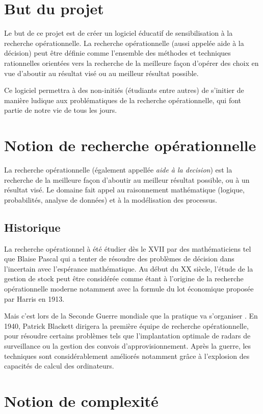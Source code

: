 \setcounter{footnote}{0}

\section{But du projet}
Le but de ce projet est de créer un logiciel éducatif de sensibilisation à la recherche
opérationnelle. La recherche opérationnelle (aussi appelée aide à la décision) peut être définie
comme l'ensemble des méthodes et techniques rationnelles orientées vers la recherche de
la meilleure façon d'opérer des choix en vue d'aboutir au résultat visé ou au meilleur résultat possible.%
~\cite{ref.yrr}

Ce logiciel permettra à des non-initiés (étudiants entre autres) de s'initier
de manière ludique aux problématiques de la recherche opérationnelle, qui font partie de notre
vie de tous les jours.

\section{Notion de recherche opérationnelle}
La recherche opérationnelle (également appellée \emph{aide à la decision})
est la recherche de la meilleure façon d'aboutir au meilleur résultat
possible, ou à un résultat visé. Le domaine fait appel au raisonnement 
mathématique (logique, probabilités, analyse de données) et à la modélisation 
des processus. 

\subsection{Historique}
La recherche opérationnel à été étudier dès le XVII par des mathématiciens tel que Blaise Pascal qui 
a tenter de résoudre des problèmes de décision dans l'incertain avec l'espérance mathématique. 
Au début du XX siècle, l'étude de la gestion de stock peut être considérée comme étant 
à l'origine de la recherche opérationnelle moderne notamment avec la formule du lot économique 
proposée par Harris en 1913. 

Mais c'est lors de la Seconde Guerre mondiale que la pratique va s'organiser . 
En 1940, Patrick Blackett dirigera la première équipe de recherche opérationnelle, 
pour résoudre certains problèmes tels que l'implantation optimale de radars de surveillance 
ou la gestion des convois d'approvisionnement. Après la guerre, les techniques sont considérablement améliorés
notamment grâce à l'explosion des capacités de calcul des ordinateurs.
\section{Notion de complexité}
